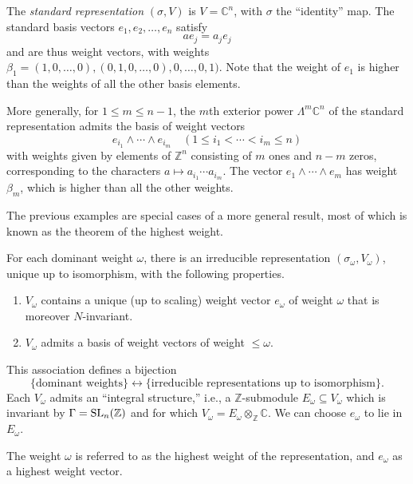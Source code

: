 \documentclass[reqno]{amsart} 
\begin{document}
\begin{example}
  The \emph{standard representation} $(\sigma,V)$ is $V = \mathbb{C}^n$, with $\sigma$ the ``identity'' map.  The standard basis vectors $e_1,e_2,\dotsc,e_n$ satisfy
  \begin{equation*}
    a e_j = a_j e_j
  \end{equation*}
  and are thus weight vectors, with weights $\beta_1 = (1,0,\dotsc,0), (0,1,0,\dotsc,0), 0,\dotsc,0,1)$.  Note that the weight of $e_1$ is higher than the weights of all the other basis elements.
\end{example}

\begin{example}\label{example:stoes2021:more-generally-1}
  More generally, for $1 \leq m \leq n-1$, the $m$th exterior power $\Lambda^m \mathbb{C}^n$ of the standard representation admits the basis of weight vectors
  \begin{equation*}
    e_{i_1} \wedge \dotsb \wedge e _{i _m} \quad (1 \leq i_1 < \dotsb < i_m \leq n)
  \end{equation*}
  with weights given by elements of $\mathbb{Z}^n$ consisting of $m$ ones and $n-m$ zeros, corresponding to the characters $a \mapsto a_{i_1} \dotsb a_{i_m}$.  The vector $e_1 \wedge \dotsb \wedge e_m$ has weight $\beta_m$, which is higher than all the other weights.
\end{example}

The previous examples are special cases of a more general result, most of which is known as the theorem of the highest weight.
\begin{theorem}
  For each dominant weight $\omega$, there is an irreducible representation $(\sigma_\omega,V_\omega)$, unique up to isomorphism, with the following properties.
  \begin{enumerate}
  \item $V_\omega$ contains a unique (up to scaling) weight vector $e_\omega$ of weight $\omega$ that is moreover $N$-invariant.
  \item $V_\omega$ admits a basis of weight vectors of weight $\leq \omega$.
  \end{enumerate}
  This association defines a bijection
  \begin{equation*}
    \{\text{dominant weights}\} \leftrightarrow \{\text{irreducible representations up to isomorphism}\}.
  \end{equation*}
  Each $V_\omega$ admits an ``integral structure,'' i.e., a $\mathbb{Z}$-submodule $E_\omega \subseteq V_\omega$ which is invariant by $\Gamma = \operatorname{SL}_n(\mathbb{Z})$ and for which $V_{\omega} = E_{\omega} \otimes_{\mathbb{Z}} \mathbb{C}$.  We can choose $e_\omega$ to lie in $E_\omega$.
\end{theorem}
The weight $\omega$ is referred to as the highest weight of the representation, and $e_\omega$ as a highest weight vector.
\end{document}

